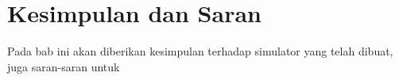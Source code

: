 \chapter{Kesimpulan dan Saran}
\label{chap:kesimpulan}

Pada bab ini akan diberikan kesimpulan terhadap simulator yang telah dibuat, juga saran-saran untuk 